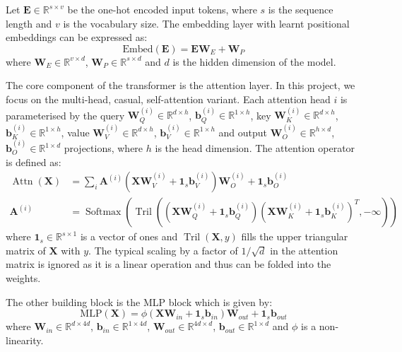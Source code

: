 \documentclass{article}
\renewcommand{\v}[1]{\mathbf{\bm{#1}}}
\newcommand{\m}[1]{\mathbf{\bm{#1}}}
\newcommand{\R}{\mathbb{R}}
\DeclareMathOperator{\softmax}{Softmax}
\DeclareMathOperator{\tril}{Tril}
\DeclareMathOperator{\attn}{Attn}
\begin{document}
Let $\m{E} \in \R^{s \times v}$ be the one-hot encoded input tokens, where $s$ is the sequence length and $v$ is the vocabulary size. The embedding layer with learnt positional embeddings can be expressed as:
\begin{equation}  \label{eq:embed}
    \text{Embed}(\m{E}) = \m{E} \m{W}_E + \m{W}_P
\end{equation}
where $\m{W}_E \in \R^{v \times d}$, $\m{W}_P \in \R^{s \times d}$ and $d$ is the hidden dimension of the model.

The core component of the transformer is the attention layer. In this project, we focus on the multi-head, casual, self-attention variant. Each attention head $i$ is parameterised by the query $\m{W}_Q^{(i)} \in \R^{d \times h}$, $\v{b}_Q^{(i)} \in \R^{1 \times h}$, key $\m{W}_K^{(i)} \in \R^{d \times h}$, $\v{b}_K^{(i)} \in \R^{1 \times h}$, value $\m{W}_V^{(i)} \in \R^{d \times h}$, $\v{b}_V^{(i)} \in \R^{1 \times h}$ and output $\m{W}_O^{(i)} \in \R^{h \times d}$, $\v{b}_O^{(i)} \in \R^{1 \times d}$ projections, where $h$ is the head dimension. The attention operator is defined as:
\begin{equation}  \label{eq:attn}
    \begin{aligned}
        \attn(\m{X})
         & = \sum_i \m{A}^{(i)} (\m{X} \m{W}_V^{(i)} + \v{1}_s \v{b}_V^{(i)}) \m{W}_O^{(i)} + \v{1}_s \v{b}_O^{(i)} \\
        \m{A}^{(i)}
         & = \softmax\left(
        \tril\left(
        \left(\m{X} \m{W}_Q^{(i)} + \v{1}_s \v{b}_Q^{(i)}\right)
        \left(\m{X} \m{W}_K^{(i)} + \v{1}_s \v{b}_K^{(i)}\right)^T
        , -\infty\right)
        \right)
    \end{aligned}
\end{equation}
where $\v{1}_s \in \R^{s \times 1}$ is a vector of ones and $\tril(\m{X}, y)$ fills the upper triangular matrix of $\m{X}$ with $y$. The typical scaling by a factor of $1/\sqrt{d}$ in the attention matrix is ignored as it is a linear operation and thus can be folded into the weights.

The other building block is the MLP block which is given by:
\begin{equation*}
    \text{MLP}(\m{X}) = \phi(
    \m{X} \m{W}_{in} + \v{1}_s \m{b}_{in}
    ) \m{W}_{out} + \v{1}_s \m{b}_{out}
\end{equation*}
where $\m{W}_{in} \in \R^{d \times 4d}$, $\v{b}_{in} \in \R^{1 \times 4d}$, $\m{W}_{out} \in \R^{4d \times d}$, $\v{b}_{out} \in \R^{1 \times d}$ and $\phi$ is a non-linearity.
\end{document}
